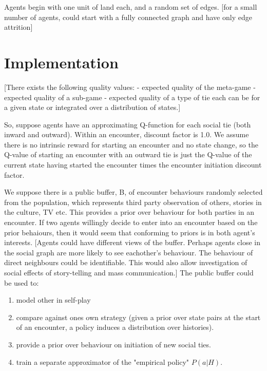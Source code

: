 \documentclass[a4paper]{report}
\begin{document}
Agents begin with one unit of land each, and a random set of edges. [for a small number of agents, could start with a fully connected graph and have only edge attrition]

\section{Implementation}

[There exists the following quality values:
- expected quality of the meta-game
- expected quality of a sub-game
- expected quality of a type of tie
each can be for a given state or integrated over a distribution of states.]

So, suppose agents have an approximating Q-function for each social tie (both inward and outward). Within an encounter, discount factor is 1.0. We assume there is no intrinsic reward for starting an encounter and no state change, so the Q-value of starting an encounter with an outward tie is just the Q-value of the current state having started the encounter times the encounter initiation discount factor.

We suppose there is a public buffer, B, of encounter behaviours randomly selected from the population, which represents third party observation of others, stories in the culture, TV etc. This provides a prior over behaviour for both parties in an encounter. If two agents willingly decide to enter into an encounter based on the prior behaiours, then it would seem that conforming to priors is in both agent's interests. [Agents could have different views of the buffer. Perhaps agents close in the social graph are more likely to see eachother's behaviour. The behaviour of direct neighbours could be identifiable. This would also allow investigation of social effects of story-telling and mass communication.] The public buffer could be used to:
\begin{enumerate}
	\item  model other in self-play
	
	\item compare against ones own strategy (given a prior over state pairs at the start of an encounter, a policy induces a distribution over histories). 
	
	\item provide a prior over behaviour on initiation of new social ties.
	
	\item train a separate approximator of the "empirical policy" $P(a|H)$. 
	
\end{enumerate}
\end{document}
